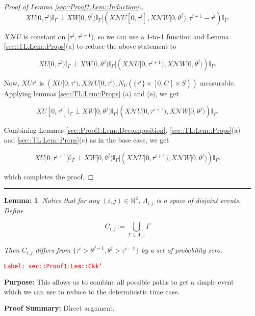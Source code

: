\documentclass[12pt]{article}
\newcommand{\mb}{\mathbb}
\newcommand{\mc}{\mathcal}
\newcommand{\tr}{\textcolor{red}}
\newcommand{\labe}[1]{\tr{\texttt{Label: #1}}}
\newcommand{\purpose}{\textbf{Purpose: }}
\newcommand{\pfsum}{\textbf{Proof Summary: }}
\newcommand{\lin}{\rule{\linewidth}{0.4 pt}}
\renewcommand{\U}{U}							%
\newcommand{\UU}{W}								%
\renewcommand{\S}{S}							%
\newcommand{\X}{X}								%
\newcommand{\neigh}{\mc{N}}						%
\newcommand{\poiss}[1]{N_{#1}}						%
\newcommand{\rt}[1]{\tau^{#1}}						%
\newcommand{\rtt}[1]{\theta^{#1}}					%
\newcommand{\itt}{i}								%
\newcommand{\ittt}{j}								%
\newcommand{\const}[1]{C_{#1}}						%
\newcommand{\apath}{\Gamma}						%
\newcommand{\pathset}[2]{\Lambda_{#1,#2}}			%
\newcommand{\pathsete}[2]{C_{#1,#2}}			%
\newtheorem{lem}[thms]{Lemma: }
\begin{document}
\begin{proof}[Proof of Lemma \ref{sec::Proof1:Lem::Induction}:]
\[\X{\U}{[0,\rt{\itt})}\mb{I}_{\apath}\perp \X{\UU}{[0,\rtt{\ittt})}\mb{I}_{\apath}|\left(\X{\neigh{\U}}{[0,\rt{\itt}]},\X{\neigh{\UU}}{[0,\rtt{\ittt})},\rt{\itt+1} - \rt{\itt}\right)\mb{I}_{\apath}.\]

\(\X{\neigh{\U}}{}\) is constant on \([\rt{\itt},\rt{\itt+1})\), so we can use a 1-to-1 function and Lemma \ref{sec::TL:Lem::Props}(a) to reduce the above statement to

\[\X{\U}{[0,\rt{\itt})}\mb{I}_{\apath}\perp \X{\UU}{[0,\rtt{\ittt})}\mb{I}_{\apath}|\left(\X{\neigh{\U}}{[0,\rt{\itt+1})},\X{\neigh{\UU}}{[0,\rtt{\ittt})}\right)\mb{I}_{\apath}.\]

Now, \(\X{\U}{\rt{\itt}}\) is \(\left(\X{\U}{[0,\rt{\itt})}, \X{\neigh{\U}}{[0,\rt{\itt})}, \poiss{\U}(\{\rt{\itt}\}\times [0,\const{}]\times\S)\right)\) measurable. Applying lemmas \ref{sec::TL:Lem::Props} (a) and (e), we get

\[\X{\U}{[0,\rt{\itt}]}\mb{I}_{\apath}\perp \X{\UU}{[0,\rtt{\ittt})}\mb{I}_{\apath}|\left(\X{\neigh{\U}}{[0,\rt{\itt+1})},\X{\neigh{\UU}}{[0,\rtt{\ittt})}\right)\mb{I}_{\apath}.\]

Combining Lemmas \ref{sec::Proof1:Lem::Decomposition}, \ref{sec::TL:Lem::Props}(a) and \ref{sec::TL:Lem::Props}(e) as in the base case, we get

\[\X{\U}{[0,\rt{\itt+1})}\mb{I}_{\apath}\perp \X{\UU}{[0,\rtt{\ittt})}\mb{I}_{\apath}|\left(\X{\neigh{\U}}{[0,\rt{\itt+1})},\X{\neigh{\UU}}{[0,\rtt{\ittt})}\right)\mb{I}_{\apath}.\]

which completes the proof.
\end{proof}

\lin

\begin{lem}
Notice that for any \((\itt,\ittt) \in \mb{N}^2\), \(\pathset{\itt}{\ittt}\) is a space of disjoint events. Define

\[\pathsete{\itt}{\ittt} := \bigcup_{\apath\in\pathset{\itt}{\ittt}} \apath\]

Then \(\pathsete{\itt}{\ittt}\) differs from \(\{\rt{\itt} > \rtt{\ittt-1}, \rtt{\ittt} > \rt{\itt-1}\}\) by a set of probability zero.
\label{sec::Proof1:Lem::Ckk'}
\end{lem}
\labe{sec::Proof1:Lem::Ckk'}

\purpose This allows us to combine all possible paths to get a simple event which we can use to reduce to the deterministic time case.

\pfsum Direct argument.
\end{document}
